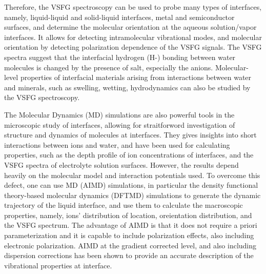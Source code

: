 Therefore, the VSFG spectroscopy can be used to probe many types of interfaces, namely, liquid-liquid and 
solid-liquid interfaces\cite{Guyot-Sionnest1987,RS91,Du93,QD94,Richmond02,Gopalakrishnan2006,ShenYR2006,Morita2008}, metal and semiconductor surfaces\cite{Harris87,Superfine88},
and determine the molecular orientation at the aqueous solution/vapor interfaces.
It allows for detecting intramolecular vibrational modes, and molecular orientation by detecting polarization dependence of the VSFG signals\cite{Vidal05}.  
The VSFG spectra suggest that the interfacial hydrogen (H-) bonding between water molecules is changed by the presence of salt, 
especially the anions\cite{EAR04}.
Molecular-level properties of interfacial materials arising from interactions between water and minerals, 
such as swelling, wetting, hydrodynamics can also be studied by the VSFG spectroscopy\cite{Rotenberg14}.

The Molecular Dynamics (MD) simulations are also powerful tools in the microscopic study of interfaces,
allowing for straitforword investigation of structure and dynamics of molecules at interfaces\cite{Morita2008}.
They gives insights into short interactions between ions and water, and have been used for calculating properties, 
such as the depth profile of ion concentrations of interfaces\cite{Jungwirth2001,Jungwirth2002}, and the VSFG spectra 
of electrolyte solution surfaces\cite{Gopalakrishnan2006,Johnson2014,Ishiyama2014,Ishiyama2017}.
However, the results depend heavily on the molecular model and interaction potentials used\cite{LXD03,MKP04,TI07,MM05}.
To overcome this defect, one can use \abinitio MD (AIMD) simulations, 
in particular the density functional theory-based molecular dynamics (DFTMD) simulations to generate the dynamic trajectory of 
the liquid interface, and use them to calculate the macroscopic properties, namely, ions' distribution of location, 
oreientation distribution, and the VSFG spectrum.  
The advantage of AIMD is that it does not require a priori parameterization and it is capable to include polarization effects\cite{Ufimtsev2011},
also including electronic polarization. AIMD at the gradient corrected level, and also including dispersion corrections\cite{Grimme04,Grimme06,Grimme07,Grimme10,Baer2011}
has been shown to provide an accurate description of the vibrational properties at interface\cite{Fornaro2015}.

